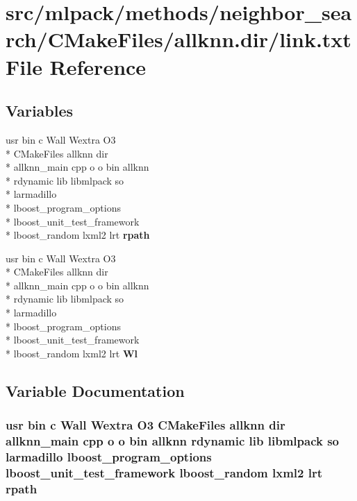 \section{src/mlpack/methods/neighbor\-\_\-search/\-C\-Make\-Files/allknn.dir/link.txt File Reference}
\label{methods_2neighbor__search_2CMakeFiles_2allknn_8dir_2link_8txt}
\subsection*{Variables}
\begin{DoxyCompactItemize}
\item 
usr bin c Wall Wextra O3 \\*
C\-Make\-Files allknn dir \\*
allknn\-\_\-main cpp o o bin allknn \\*
rdynamic lib libmlpack so \\*
larmadillo \\*
lboost\-\_\-program\-\_\-options \\*
lboost\-\_\-unit\-\_\-test\-\_\-framework \\*
lboost\-\_\-random lxml2 lrt {\bf rpath}
\item 
usr bin c Wall Wextra O3 \\*
C\-Make\-Files allknn dir \\*
allknn\-\_\-main cpp o o bin allknn \\*
rdynamic lib libmlpack so \\*
larmadillo \\*
lboost\-\_\-program\-\_\-options \\*
lboost\-\_\-unit\-\_\-test\-\_\-framework \\*
lboost\-\_\-random lxml2 lrt {\bf Wl}
\end{DoxyCompactItemize}


\subsection{Variable Documentation}
\subsubsection[{rpath}]{\setlength{\rightskip}{0pt plus 5cm}usr bin c Wall Wextra O3 C\-Make\-Files allknn dir allknn\-\_\-main cpp o o bin allknn rdynamic lib libmlpack so larmadillo lboost\-\_\-program\-\_\-options lboost\-\_\-unit\-\_\-test\-\_\-framework lboost\-\_\-random lxml2 lrt rpath}\label{methods_2neighbor__search_2CMakeFiles_2allknn_8dir_2link_8txt_a97f160696cbfeb05390c8c3e1abcfb61}


